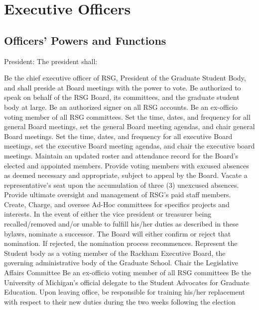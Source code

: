 \chapter{Executive Officers}
\section{Officers' Powers and Functions}
\begin{enumsubsection}
\item{President:} The president shall: 
\begin{enumsubsubsection}
\itemnotoc Be the chief executive officer of RSG, President of the Graduate Student 
Body, and shall preside at Board meetings with the power to vote. 
\itemnotoc Be authorized to speak on behalf of the RSG Board, its committees, and 
the graduate student body at large.
\itemnotoc Be an authorized signer on all RSG accounts. 
\itemnotoc Be an ex-officio voting member of all RSG committees. 
\itemnotoc Set the time, dates, and frequency for all general Board meetings, set the 
general Board meeting agendas, and chair general Board meetings. 
\itemnotoc Set the time, dates, and frequency for all executive Board meetings, set 
the executive Board meeting agendas, and chair the executive board 
meetings.
\itemnotoc Maintain an updated roster and attendance record for the Board's 
elected and appointed members. 
\itemnotoc Provide voting members with excused absences as deemed necessary 
and appropriate, subject to appeal by the Board. 
\itemnotoc Vacate a representative's seat upon the accumulation of three (3) 
unexcused absences.
\itemnotoc Provide ultimate oversight and management of RSG's paid staff 
members. 
\itemnotoc Create, Charge, and oversee Ad-Hoc committees for specifics projects 
and interests. 
\itemnotoc In the event of either the vice president or treasurer being 
recalled/removed and/or unable to fulfill his/her duties as described in 
these bylaws, nominate a successor. The Board will either confirm or 
reject that nomination. If rejected, the nomination process recommences. 
\itemnotoc Represent the Student body as a voting member of the Rackham 
Executive Board, the governing administrative body of the Graduate 
School. 
\itemnotoc Chair the Legislative Affairs Committee
\itemnotoc Be an ex-officio voting member of all RSG committees
\itemnotoc Be the University of Michigan's official delegate to the Student 
Advocates for Graduate Education.
\itemnotoc Upon leaving office, be responsible for training his/her replacement with 
respect to their new duties during the two weeks following the election 

\end{enumsubsubsection}
\end{enumsubsection}
